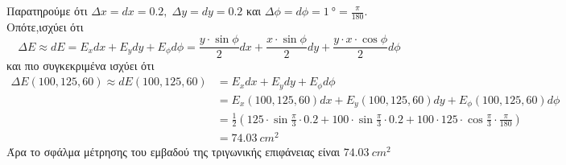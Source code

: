 \begin{solution}
\item {}

  Παρατηρούμε ότι $ \Delta x = dx = 0.2, \; \Delta y = dy = 0.2 $ και 
  $ \Delta \phi = d\phi = \SI{1}{\degree} = \frac{\pi}{180} $. Οπότε,ισχύει ότι
  \begin{equation*}
    \Delta E \approx dE = E_{x} dx + E_{y} dy + E_{\phi} d\phi = \frac{y \cdot
    \sin{\phi}}{2} dx + \frac{x \cdot \sin{\phi}}{2} dy + 
    \frac{y \cdot x \cdot \cos{\phi}}{2} d\phi
  \end{equation*} 
  και πιο συγκεκριμένα ισχύει ότι 
  \begin{align*}
    \Delta E(100,125,60) \approx dE(100,125,60) 
  &= E_{x} dx + E_{y} dy + E_{\phi} d\phi \\
  &= E_{x}(100,125,60) dx + E_{y}(100,125,60) dy + E_{\phi}(100,125,60) d\phi \\
  &= \frac{1}{2} \left(125 \cdot \sin{\frac{\pi}{3}} \cdot 0.2 + 100 \cdot
    \sin{\frac{\pi}{3}} \cdot 0.2 + 100 \cdot 125 \cdot \cos{\frac{\pi}{3}} \cdot
  \frac{\pi}{180}\right) \\
  &= \SI{74.03}{cm^{2}}
  \end{align*}
  Άρα το σφάλμα μέτρησης του εμβαδού της τριγωνικής επιφάνειας είναι 
  $ \SI{74.03}{cm^{2}} $
\end{solution}

